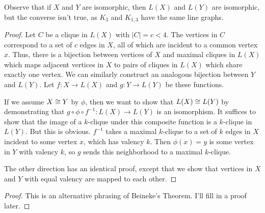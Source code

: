 Observe that if $X$ and $Y$ are isomorphic, then $L(X)$ and $L(Y)$ are isomorphic, but the converse isn't true, as $K_3$ and $K_{1,3}$ have the same line graphs.


\begin{proof}
	Let $C$ be a clique in $L(X)$ with $|C|=c<4$.  The vertices in $C$ correspond to a set of $c$ edges in $X$, all of which are incident to a common vertex $x$.  Thus, there is a bijection between vertices of $X$ and maximal cliques in $L(X)$ which maps adjacent vertices in $X$ to pairs of cliques in $L(X)$ which share exactly one vertex.  We can similarly construct an analogous bijection between $Y$ and $L(Y)$.  Let $f:X\rightarrow L(X)$ and $g:Y\rightarrow L(Y)$ be these functions.
	
	If we assume $X\cong Y$ by $\phi$, then we want to show that $L(X)\cong L(Y)$ by demonstrating that $g\circ\phi\circ f^{-1}:L(X)\rightarrow L(Y)$ is an isomorphism.  It suffices to show that the image of a $k$-clique under this composite function is a $k$-clique in $L(Y)$.  But this is obvious.  $f^{-1}$ takes a maximal $k$-clique to a set of $k$ edges in $X$ incident to some vertex $x$, which has valency $k$.  Then $\phi(x)=y$ is some vertex in $Y$ with valency $k$, so $g$ sends this neighborhood to a maximal $k$-clique.
	
	The other direction has an identical proof, except that we show that vertices in $X$ and $Y$ with equal valency are mapped to each other.
\end{proof}


\begin{proof}
	
	This is an alternative phrasing of Beineke's Theorem.  I'll fill in a proof later.
	
\end{proof}





